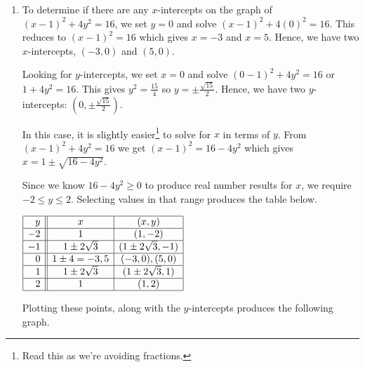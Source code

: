 \documentclass{ximera}
\begin{document}
\begin{example}
\begin{explanation}
\begin{enumerate}
\item  To determine if there are any $x$-intercepts on the graph of   $(x-1)^2+4y^2 = 16$, we set $y=0$ and solve $(x-1)^2+4(0)^2 = 16$.  This reduces to $(x-1)^2 = 16$ which gives $x = -3$ and $x=5$.  Hence, we have two $x$-intercepts, $(-3,0)$ and $(5,0)$.  

Looking for $y$-intercepts, we set $x=0$ and solve $(0-1)^2+4y^2 = 16$ or $1 + 4y^2 = 16$.  This gives $y^2 = \frac{15}{4}$ so $y= \pm \frac{\sqrt{15}}{2}$.  Hence, we have two $y$-intercepts:  $\left(0, \pm \frac{\sqrt{15}}{2} \right)$. 

In this case, it is slightly easier\footnote{Read this as we're avoiding fractions.} to solve for $x$ in terms of $y$.  From $(x-1)^2+4y^2 = 16$ we get $(x-1)^2 = 16-4y^2$ which gives $x = 1 \pm \sqrt{16-4y^2}$.  

Since we know $16-4y^2 \geq 0$ to produce real number results for $x$, we require $-2 \leq y \leq 2$.  Selecting values in that range produces the table below.  

\begin{center}

$\begin{array}{|r||c|c|}  \hline

  y & x & (x,y) \\ \hline
 -2 & 1 & (1, -2) \\  \hline
 -1 & 1 \pm 2\sqrt{3} & (1 \pm 2\sqrt{3},-1) \\  \hline
  0 & 1 \pm 4 = -3, 5 & (-3, 0), (5,0)  \\  \hline
  1 & 1 \pm 2 \sqrt{3} & (1 \pm 2\sqrt{3}, 1)  \\  \hline
 2 & 1  & (1, 2) \\  \hline
 
\end{array}$
\end{center}

Plotting these points, along with the $y$-intercepts produces the following graph.

\begin{image}
\end{image}
\end{enumerate}
\end{explanation}
\end{example}
\end{document}
